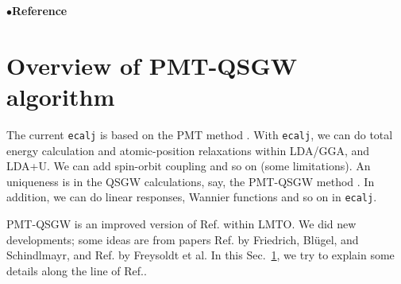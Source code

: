 \documentclass[a4paper,10pt,epsf,fleqn]{article}
\begin{document}
\tableofcontents
\vspace{5mm}
\noindent$\bullet${\bf Reference}



\newpage




\newpage
\section{Overview of PMT-QSGW algorithm}
\label{sec:theory}
The current {\tt ecalj} is based on the PMT method
\cite{kotani2015pmt,kotani_linearized_2013,pmt1}.
With {\tt ecalj}, we can do total energy calculation and 
atomic-position relaxations within LDA/GGA, and LDA+U.
We can add spin-orbit coupling and so on (some limitations).
An uniqueness is in the QSGW calculations, say, the PMT-QSGW method
\cite{kotani_quasiparticle_2014}. 
In addition, we can do linear responses, Wannier functions and 
so on in {\tt ecalj}.

PMT-QSGW is an improved version of 
Ref.\cite{kotani_quasiparticle_2007} within LMTO.
We did new developments; some ideas are from papers
Ref.\cite{friedrich_efficient_2010} 
by Friedrich, Bl\"ugel, and Schindlmayr,
and Ref.\cite{Freysoldt2007} by Freysoldt et al.
In this Sec.~\ref{sec:theory}, we try to explain some details along
the line of Ref.\cite{kotani_quasiparticle_2014}.
\end{document}
